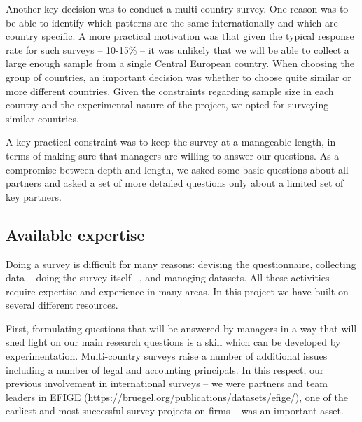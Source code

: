\usepackage{}\documentclass[final, dvipsnames, authoryear,12pt]{elsarticle}
\begin{document}
Another key decision was to conduct a multi-country survey. One reason was to be able to identify which patterns are the same internationally and which are country specific. A more practical motivation was that given the typical response rate for such surveys -- 10-15\% -- it was unlikely that we will be able to collect a large enough sample from a single Central European country. When choosing the group of countries, an important decision was whether to choose quite similar or more different countries. Given the constraints regarding sample size in each country and the experimental nature of the project, we opted for surveying similar countries.

A key practical constraint was to keep the survey at a manageable length, in terms of making sure that managers are willing to answer our questions. As a compromise between depth and length, we asked some basic questions about all partners and asked a set of more detailed questions only about a limited set of key partners. 



\subsection{Available expertise}

Doing a survey is difficult for many reasons: devising the questionnaire, collecting data -- doing the survey itself --, and managing datasets. All these activities require expertise and experience in many areas. In this project we have built on several different resources.

First, formulating questions that will be answered by managers in a way that will shed light on our main research questions is a skill which can be developed by experimentation. Multi-country surveys raise a number of additional issues including a number of legal and accounting principals. In this respect, our previous involvement in international surveys -- we were partners and team leaders in EFIGE (\url{https://bruegel.org/publications/datasets/efige/}), one of the earliest and most successful survey projects on firms -- was an important asset. 
\end{document}
